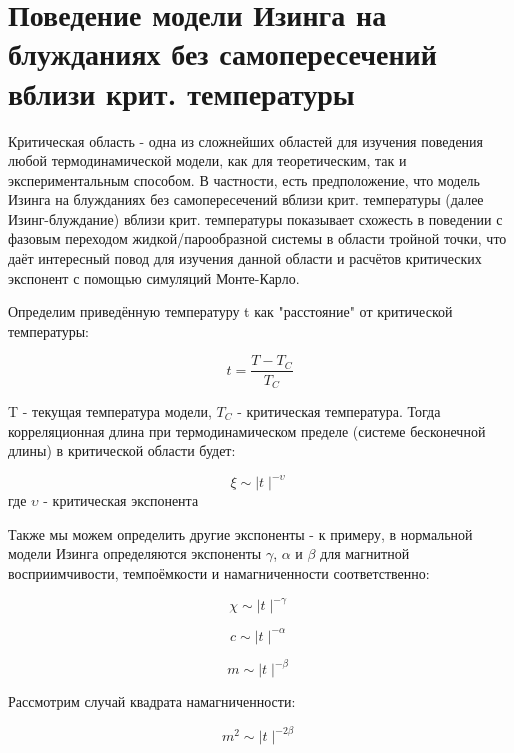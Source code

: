 \section{Поведение модели Изинга на блужданиях без самопересечений вблизи крит. температуры}

Критическая область - одна из сложнейших областей для изучения поведения любой термодинамической модели, как для теоретическим, так и экспериментальным способом. В частности, есть предположение, что модель Изинга на блужданиях без самопересечений вблизи крит. температуры (далее Изинг-блуждание) вблизи крит. температуры показывает схожесть в поведении с фазовым переходом жидкой/парообразной системы в области тройной точки, что даёт интересный повод для изучения данной области и расчётов критических экспонент с помощью симуляций Монте-Карло.

Определим приведённую температуру t как "расстояние" от критической температуры:

\begin{equation} \label{eq:redTemp}
    t = \frac{T - T_{C}}{T_{C}}
\end{equation}

T - текущая температура модели, $T_{C}$ - критическая температура. Тогда корреляционная длина при термодинамическом пределе (системе бесконечной длины) в критической области будет:

\begin{equation}\label{eq:CorLen}
    \xi \sim \mid t \mid ^{-\upsilon} 
\end{equation}
где $\upsilon$ - критическая экспонента

Также мы можем определить другие экспоненты - к примеру, в нормальной модели Изинга определяются экспоненты $\gamma$, $\alpha$ и $\beta$ для магнитной восприимчивости, темпоёмкости и намагниченности соответственно:

\begin{equation}
    \chi \sim \mid t \mid ^{-\gamma}
\end{equation}

\begin{equation}
    c \sim \mid t \mid ^{-\alpha}
\end{equation}

\begin{equation}
    m \sim \mid t \mid ^{-\beta}
\end{equation}

Рассмотрим случай квадрата намагниченности:

\begin{equation}
    m^{2} \sim \mid t \mid ^{-2\beta}
\end{equation}

